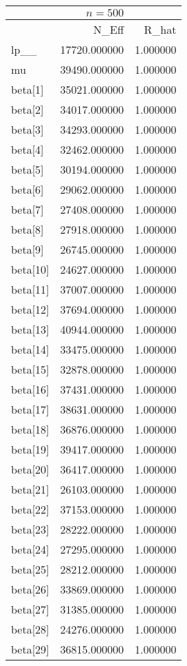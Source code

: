 \begin{tabular}{lrr}
& $ n = 500 $ & \\
\toprule
 & N\_Eff & R\_hat \\
\midrule
lp\_\_ & 17720.000000 & 1.000000 \\
mu & 39490.000000 & 1.000000 \\
beta[1] & 35021.000000 & 1.000000 \\
beta[2] & 34017.000000 & 1.000000 \\
beta[3] & 34293.000000 & 1.000000 \\
beta[4] & 32462.000000 & 1.000000 \\
beta[5] & 30194.000000 & 1.000000 \\
beta[6] & 29062.000000 & 1.000000 \\
beta[7] & 27408.000000 & 1.000000 \\
beta[8] & 27918.000000 & 1.000000 \\
beta[9] & 26745.000000 & 1.000000 \\
beta[10] & 24627.000000 & 1.000000 \\
beta[11] & 37007.000000 & 1.000000 \\
beta[12] & 37694.000000 & 1.000000 \\
beta[13] & 40944.000000 & 1.000000 \\
beta[14] & 33475.000000 & 1.000000 \\
beta[15] & 32878.000000 & 1.000000 \\
beta[16] & 37431.000000 & 1.000000 \\
beta[17] & 38631.000000 & 1.000000 \\
beta[18] & 36876.000000 & 1.000000 \\
beta[19] & 39417.000000 & 1.000000 \\
beta[20] & 36417.000000 & 1.000000 \\
beta[21] & 26103.000000 & 1.000000 \\
beta[22] & 37153.000000 & 1.000000 \\
beta[23] & 28222.000000 & 1.000000 \\
beta[24] & 27295.000000 & 1.000000 \\
beta[25] & 28212.000000 & 1.000000 \\
beta[26] & 33869.000000 & 1.000000 \\
beta[27] & 31385.000000 & 1.000000 \\
beta[28] & 24276.000000 & 1.000000 \\
beta[29] & 36815.000000 & 1.000000 \\

\end{tabular}
